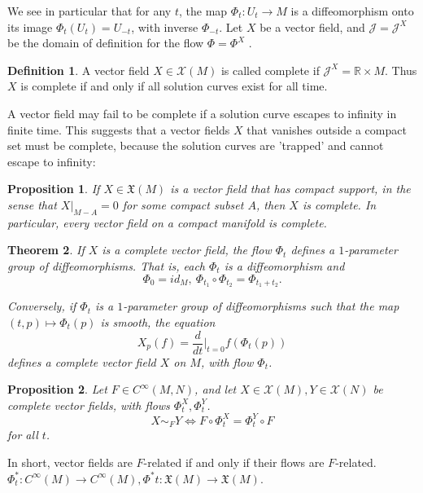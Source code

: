 \documentclass{article}
\newtheorem{theorem}{Theorem}[section]
\newtheorem{proposition}{Proposition}[theorem]
\theoremstyle{definition}
\newtheorem{defn}[theorem]{Definition}
\newenvironment{definition}
  {\vspace{8pt}\begin{mdframed}[backgroundcolor=blueish,innertopmargin=4]\begin{defn}}
  {\end{defn}\end{mdframed}\vspace{4pt}}
\begin{document}
We see in particular that for any $t$, the map $\Phi_t : U_t \rightarrow M$ is a diffeomorphism onto its image $\Phi_t(U_t) = U_{-t}$, with inverse $\Phi_{-t}$. Let $X$ be a vector field, and $\mathscr J = \mathscr J^X$ be the domain of definition for the flow $\Phi = \Phi^X$ .


\begin{definition}
A vector field $X \in \mathscr X (M)$ is called complete if $\mathscr J^X = \mathbb R \times M$. Thus $X$ is complete if and only if all solution curves exist for all time.
\end{definition}

A vector field may fail to be complete if a solution curve escapes to infinity in finite time. This suggests that a vector fields $X$ that vanishes outside a compact set must be complete, because the solution curves are 'trapped' and cannot escape to infinity:

\begin{proposition}

If $X \in \mathfrak X(M)$ is a vector field that has compact support, in the sense that $X |_{M-A} = 0$ for some compact subset $A$, then $X$ is complete. In particular, every vector field on a compact manifold is complete.
\end{proposition}

\begin{theorem}

If $X$ is a complete vector field, the flow $\Phi_t$ defines a $1$-parameter group of diffeomorphisms. That is, each $\Phi_t$ is a diffeomorphism and 
\[
    \Phi_0 = id_M, \  \Phi_{t_1} \circ \Phi_{t_2} = \Phi_{t_1+t_2}.
\]

Conversely, if $\Phi_t$ is a $1$-parameter group of diffeomorphisms such that the map $(t, p) \mapsto \Phi_t(p)$ is smooth, the equation
\[
    X_p(f) = \frac{d}{dt} \Bigr  |_{t=0} f(\Phi_{t}(p)) 
\]
defines a complete vector field $X$ on $M$, with flow $\Phi_t$.
\end{theorem}

\begin{proposition}
Let $F \in C^\infty(M,N)$, and let $X \in \mathscr X(M), Y \in \mathscr X(N)$ be complete vector fields, with flows $\Phi^X_t , \Phi^Y_t$.
\[
    X \sim_F Y \iff F \circ \Phi^X_t = \Phi^Y_t \circ F
\]
for all $t$.
\end{proposition}

In short, vector fields are $F$-related if and only if their flows are $F$-related. $\Phi^*_t : C^\infty (M) \rightarrow C^\infty (M), \Phi^* t : \mathfrak X(M) \rightarrow \mathfrak X(M)$. 
\end{document}
